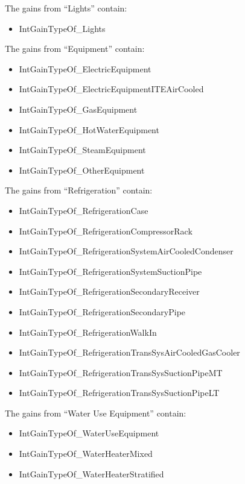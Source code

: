 The gains from ``Lights'' contain:

\begin{itemize}
\tightlist
\item
  IntGainTypeOf\_Lights
\end{itemize}

The gains from ``Equipment'' contain:

\begin{itemize}
\item
  IntGainTypeOf\_ElectricEquipment
\item
  IntGainTypeOf\_ElectricEquipmentITEAirCooled
\item
  IntGainTypeOf\_GasEquipment
\item
  IntGainTypeOf\_HotWaterEquipment
\item
  IntGainTypeOf\_SteamEquipment
\item
  IntGainTypeOf\_OtherEquipment
\end{itemize}

The gains from ``Refrigeration'' contain:

\begin{itemize}
\item
  IntGainTypeOf\_RefrigerationCase
\item
  IntGainTypeOf\_RefrigerationCompressorRack
\item
  IntGainTypeOf\_RefrigerationSystemAirCooledCondenser
\item
  IntGainTypeOf\_RefrigerationSystemSuctionPipe
\item
  IntGainTypeOf\_RefrigerationSecondaryReceiver
\item
  IntGainTypeOf\_RefrigerationSecondaryPipe
\item
  IntGainTypeOf\_RefrigerationWalkIn
\item
  IntGainTypeOf\_RefrigerationTransSysAirCooledGasCooler
\item
  IntGainTypeOf\_RefrigerationTransSysSuctionPipeMT
\item
  IntGainTypeOf\_RefrigerationTransSysSuctionPipeLT
\end{itemize}

The gains from ``Water Use Equipment'' contain:

\begin{itemize}
\item
  IntGainTypeOf\_WaterUseEquipment
\item
  IntGainTypeOf\_WaterHeaterMixed
\item
  IntGainTypeOf\_WaterHeaterStratified
\end{itemize}


